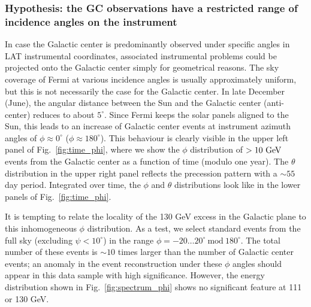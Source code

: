 \documentclass[aps,twocolumn,prd,superscriptaddress,showpacs,nofootinbib,fixfloat]{revtex4}
\newcommand{\GeV}{{\rm ~GeV}}
\begin{document}
\subsubsection{Hypothesis: the GC observations have a
restricted range of incidence angles on the instrument}

In case the Galactic center is predominantly observed under
specific angles in LAT instrumental coordinates, associated
instrumental problems could be projected onto the Galactic
center simply for geometrical reasons. The sky coverage of
Fermi at various incidence angles is usually approximately
uniform, but this is not necessarily the case for the
Galactic center.  In late December (June), the angular
distance between the Sun and the Galactic center
(anti-center) reduces to about $5^\circ$.  Since Fermi keeps
the solar panels aligned to the Sun, this leads to an
increase of Galactic center events at instrument azimuth
angles of $\phi\approx 0^\circ$ ($\phi\approx 180^\circ$).
This behaviour is clearly visible in the upper left panel of
Fig.~\ref{fig:time_phi}, where we show the $\phi$
distribution of $>10\GeV$ events from the Galactic center as
a function of time (modulo one year).  The $\theta$
distribution in the upper right panel reflects the
precession pattern with a $\sim55$ day period. Integrated
over time, the $\phi$ and $\theta$ distributions look like
in the lower panels of Fig.~\ref{fig:time_phi}.

It is tempting to relate the locality of the 130 GeV excess
in the Galactic plane to this inhomogeneous $\phi$
distribution. As a test, we select standard events from the
full sky (excluding $\psi < 10^\circ$) in the range $\phi=
-20\dots20^\circ\ \text{mod}\ 180^\circ$. The total number
of these events is $\sim10$ times larger than the number of
Galactic center events; an anomaly in the event
reconstruction under these $\phi$ angles should appear in
this data sample with high significance.  However, the
energy distribution shown in Fig.~\ref{fig:spectrum_phi}
shows no significant feature at 111 or 130 GeV.
\end{document}
